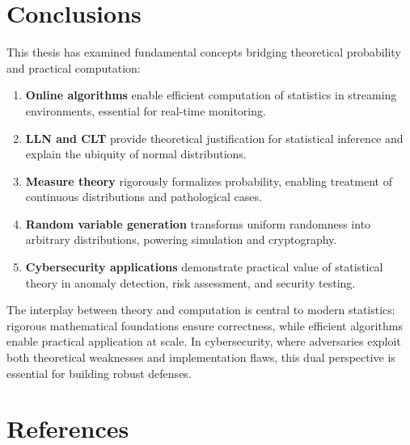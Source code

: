 \documentclass[12pt,a4paper]{article}
\begin{document}
\section{Conclusions}

This thesis has examined fundamental concepts bridging theoretical probability and practical computation:

\begin{enumerate}
\item \textbf{Online algorithms} enable efficient computation of statistics in streaming environments, essential for real-time monitoring.

\item \textbf{LLN and CLT} provide theoretical justification for statistical inference and explain the ubiquity of normal distributions.

\item \textbf{Measure theory} rigorously formalizes probability, enabling treatment of continuous distributions and pathological cases.

\item \textbf{Random variable generation} transforms uniform randomness into arbitrary distributions, powering simulation and cryptography.

\item \textbf{Cybersecurity applications} demonstrate practical value of statistical theory in anomaly detection, risk assessment, and security testing.
\end{enumerate}

The interplay between theory and computation is central to modern statistics: rigorous mathematical foundations ensure correctness, while efficient algorithms enable practical application at scale. In cybersecurity, where adversaries exploit both theoretical weaknesses and implementation flaws, this dual perspective is essential for building robust defenses.

\section*{References}
\end{document}
